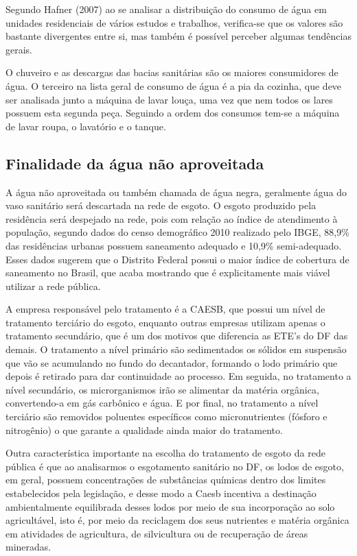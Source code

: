 	Segundo Hafner (2007) ao se analisar a distribuição do consumo de água em unidades residenciais de vários estudos e trabalhos, verifica-se que os valores são bastante divergentes entre si, mas também é possível perceber algumas tendências gerais. 
	
	O chuveiro e as descargas das bacias sanitárias são os maiores consumidores de água. O terceiro na lista geral de consumo de água é a pia da cozinha, que deve ser analisada junto a máquina de lavar louça, uma vez que nem todos os lares possuem esta segunda peça. Seguindo a ordem dos consumos tem-se a máquina de lavar roupa, o lavatório e o tanque.

\subsection{Finalidade da água não aproveitada}

	A água não aproveitada ou também chamada de água negra, geralmente água do vaso sanitário será descartada na rede de esgoto. O esgoto produzido pela residência será despejado na rede, pois com relação ao índice de atendimento à população, segundo dados do censo demográfico 2010 realizado pelo IBGE, 88,9\% das residências urbanas possuem saneamento adequado e 10,9\% semi-adequado. Esses dados sugerem que o Distrito Federal possui o maior índice de cobertura de saneamento no Brasil, que acaba mostrando que é explicitamente mais viável utilizar a rede pública.

	A empresa responsável pelo tratamento é a CAESB, que possui um nível de tratamento terciário do esgoto, enquanto outras empresas utilizam apenas o tratamento secundário, que é um dos motivos que diferencia as ETE's do DF das demais. O tratamento a nível primário são sedimentados os sólidos em suspensão que vão se acumulando no fundo do decantador, formando o lodo primário que depois é retirado para dar continuidade ao processo. Em seguida, no tratamento a nível secundário, os microrganismos irão se alimentar da matéria orgânica, convertendo-a em gás carbônico e água. E por final, no tratamento a nível terciário são removidos poluentes específicos como micronutrientes (fósforo e nitrogênio) o que garante a qualidade ainda maior do tratamento.
	
	Outra característica importante na escolha do tratamento de esgoto da rede pública é que ao analisarmos o esgotamento sanitário no DF, os lodos de esgoto, em geral, possuem concentrações de substâncias químicas dentro dos limites estabelecidos pela legislação, e desse modo a Caesb incentiva a destinação ambientalmente equilibrada desses lodos por meio de sua incorporação ao solo agricultável, isto é, por meio da reciclagem dos seus nutrientes e matéria orgânica em atividades de agricultura, de silvicultura ou de recuperação de áreas mineradas.

